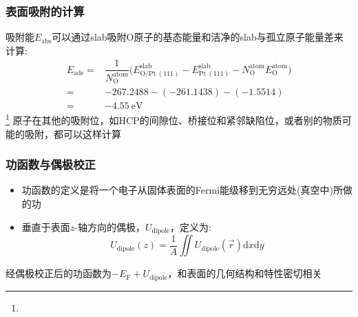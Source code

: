 \frame
{
	\frametitle{表面吸附的计算}
吸附能$E_{\mathrm{abs}}$可以通过\textrm{slab}吸附\textrm{O}原子的基态能量和洁净的\textrm{slab}与孤立原子能量差来计算:~
\begin{displaymath}
	\begin{aligned}
		E_{\mathrm{ads}}=&\dfrac1{N_{\mathrm{O}}^{\mathrm{atom}}}\big(E_{\mathrm{O/Pt~(111)}}^{\mathrm{slab}}-E_{\mathrm{Pt~(111)}}^{\mathrm{slab}}-N_{\mathrm{O}}^{\mathrm{atom}}E_{\mathrm{O}}^{\mathrm{atom}}\big)\\
		=&-267.2488-(-261.1438)-(-1.5514)\\
		=&-4.55\mathrm{~eV}
	\end{aligned}
\end{displaymath}
{\fontsize{7.2pt}{5.2pt}\selectfont{习惯将吸附能只取其绝对值}}%
\footnote{\fontsize{6.2pt}{5.2pt}}
\vskip 8pt
原子在其他的吸附位，如\textrm{HCP}的间隙位、桥接位和紧邻缺陷位，或者别的物质可能的吸附，都可以这样计算

}
\frame
{
	\frametitle{功函数与偶极校正}
	\begin{itemize}
		\item 功函数的定义是将一个电子从固体表面的\textrm{Fermi}能级移到无穷远处(真空中)所做的功
		\item 垂直于表面$z$-轴方向的偶极，$U_{\mathrm{dipole}}$，定义为:~
\begin{displaymath}
	U_{\mathrm{dipole}}(z)=\dfrac1A\iint U_{\mathrm{dipole}}(\vec r)\mathrm{d}x\mathrm{d}y
\end{displaymath}
	\end{itemize}
经偶极校正后的功函数为$-E_{\mathrm{F}}+U_{\mathrm{dipole}}$，和表面的几何结构和特性密切相关
}

